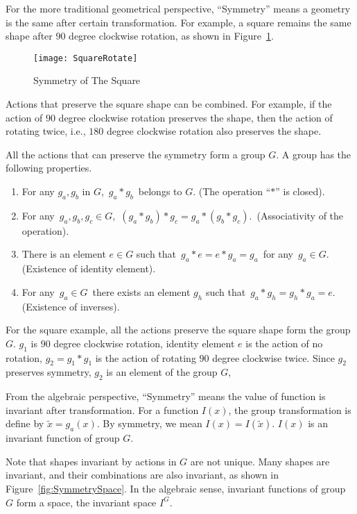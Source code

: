 For the more traditional geometrical perspective, ``Symmetry''  means a geometry is the same after certain transformation.
For example, a square remains the same shape after  $90$ degree clockwise rotation, as shown in Figure~\ref{fig:symsquare}.
\begin{figure}[!htbp]
  	\begin{center}
   	\texttt{[image: SquareRotate]}
	\end{center}
	\caption{Symmetry of The Square}
    \label{fig:symsquare}
\end{figure}

Actions that preserve the square shape can be combined.
For example, if the action of $90$ degree clockwise rotation preserves the shape, then the action of rotating twice, i.e., $180$ degree clockwise rotation also preserves the shape.

All the actions that can preserve the symmetry form a group $G$.
A group has the following properties.
\begin{enumerate}
\item For any $g_a,g_b$ in $G$, \,$g_a*g_b$\, belongs to $G$. (The operation ``$*$'' is closed).

\item For any \,$g_a,g_b,g_c\in G$, \,$(g_a*g_b)*g_c=g_a*(g_b*g_c)$. \,(Associativity of the operation).

\item There is an element $e\in G$ such that \,$g_a*e=e*g_a=g_a$\, for any \,$g_a\in G$. (Existence of identity element).

\item For any \,$g_a\in G$\, there exists an element $g_h$ such that \,$g_a*g_h=g_h*g_a=e$. \,(Existence of inverses).
\end{enumerate}

For the square example, all the actions preserve the square shape form the group $G$.
$g_1$ is  $90$ degree clockwise rotation, identity element $e$ is the action of no rotation,
$g_2=g_1*g_1$ is the action of rotating $90$ degree clockwise twice.
Since $g_2$ preserves symmetry, $g_2$ is an element of the group $G$, 


From the algebraic perspective, ``Symmetry'' means the value of function is invariant after transformation.
For a function $I(x)$,
the group transformation is define by $\tilde{x}=g_a(x)$.
By symmetry, we mean $I(x)=I(\tilde{x})$.
$I(x)$ is an invariant function of group $G$.


Note that  shapes invariant by actions in $G$  are not unique.
Many shapes are invariant, and their combinations are also invariant, as shown in Figure~\ref{fig:SymmetrySpace}. 
In the algebraic sense,  invariant functions of group $G$ form a space, the invariant space $I^G$.


